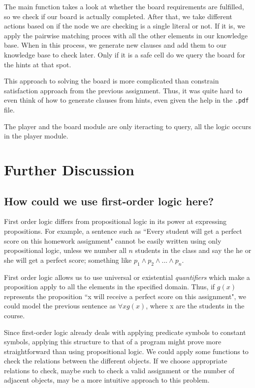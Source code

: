 \documentclass{article}
\begin{document}
The main function takes a look at whether the board requirements are fulfilled, so we 
check if our board is actually completed. After that, we take different actions based 
on if the node we are checking is a single literal or not. If it is, we apply the 
pairwise matching proces with all the other elements in our knowledge base. When in this
process, we generate new clauses and add them to our knowledge base to check later. 
Only if it is a safe cell do we query the board for the hints at that spot.

This approach to solving the board is more complicated than constrain satisfaction 
approach from the previous assignment. Thus, it was quite hard to even think of how 
to generate clauses from hints, even given the help in the \texttt{.pdf} file.

The player and the board module are only iteracting to query, all the logic occurs in the player module.
\section{Further Discussion}
	\subsection{How could we use first-order logic here?}
		First order logic differs from propositional logic in its power at expressing propositions. For 
		example, a sentence such as ``Every student will get a perfect score on this homework assignment"
		cannot be easily written using only propositional logic, unless we number all $n$  students  in the
		class and say the he or she will get a perfect score; something like 
		$p_{1}\land p_{2}\land ...\land p_{n}$.
		
		First order logic allows us to use universal or existential \textit{quantifiers} which make a 
		proposition apply to all the elements in the specified domain. Thus, if $g(x)$ represents the 
		proposition ``x will receive a perfect score on this assignment", we could model the previous
		sentence as $\forall x g(x)$, where x are the students in the course.
	
		Since first-order logic already deals with applying predicate symbols to constant symbols,
		applying this structure to that of a program might prove more straightforward than using 
		propositional logic. We could apply some functions to check the relations between the different
		objects. If we choose appropriate relations to check, maybe such to check a valid assignment 
		or the number of adjacent objects, may be a more intuitive approach to this problem.
\end{document}
